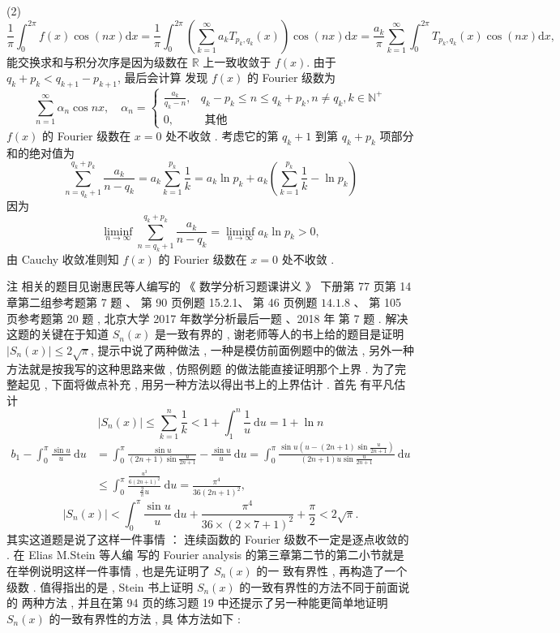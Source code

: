 \documentclass[10pt]{article}
\begin{document}
{(2)
$$
\frac{1}{\pi} \int_{0}^{2 \pi} f(x) \cos (n x) \mathrm{d} x=\frac{1}{\pi} \int_{0}^{2 \pi}\left(\sum_{k=1}^{\infty} a_{k} T_{p_{k}, q_{k}}(x)\right) \cos (n x) \mathrm{d} x=\frac{a_{k}}{\pi} \sum_{k=1}^{\infty} \int_{0}^{2 \pi} T_{p_{k}, q_{k}}(x) \cos (n x) \mathrm{d} x,
$$
 能交换求和与积分次序是因为级数在  $\mathbb{R}$  上一致收敛于  $f(x)$.  由于  $q_{k}+p_{k}<q_{k+1}-p_{k+1}$,  最后会计算   发现  $f(x)$  的  Fourier  级数为 
$$
\sum_{n=1}^{\infty} \alpha_{n} \cos n x, \quad \alpha_{n}= \begin{cases}\frac{a_{k}}{q_{k}-n}, & q_{k}-p_{k} \leqslant n \leqslant q_{k}+p_{k}, n \neq q_{k}, k \in \mathbb{N}^{+} \\ 0, & \text { 其他 }\end{cases}
$$
$f(x)$  的  Fourier  级数在  $x=0$  处不收敛 .  考虑它的第  $q_{k}+1$  到第  $q_{k}+p_{k}$  项部分和的绝对值为 
$$
\sum_{n=q_{k}+1}^{q_{k}+p_{k}} \frac{a_{k}}{n-q_{k}}=a_{k} \sum_{k=1}^{p_{k}} \frac{1}{k}=a_{k} \ln p_{k}+a_{k}\left(\sum_{k=1}^{p_{k}} \frac{1}{k}-\ln p_{k}\right)
$$
 因为 
$$
\liminf _{n \rightarrow \infty} \sum_{n=q_{k}+1}^{q_{k}+p_{k}} \frac{a_{k}}{n-q_{k}}=\liminf _{n \rightarrow \infty} a_{k} \ln p_{k}>0,
$$
 由  Cauchy  收敛准则知  $f(x)$  的  Fourier  级数在  $x=0$  处不收敛 .

 注   相关的题目见谢惠民等人编写的 《 数学分析习题课讲义 》 下册第  77  页第  14  章第二组参考题第  7  题 、 第  90  页例题  15.2.1、 第  46  页例题  $14.1 .8$ 、 第  105  页参考题第  20  题 ,  北京大学  2017  年数学分析最后一题 、2018  年   第  7  题 .  解决这题的关键在于知道  $S_{n}(x)$  是一致有界的 ,  谢老师等人的书上给的题目是证明  $\left|S_{n}(x)\right| \leqslant 2 \sqrt{\pi}$,  提示中说了两种做法 ,  一种是模仿前面例题中的做法 ,  另外一种方法就是按我写的这种思路来做 ,  仿照例题   的做法能直接证明那个上界 .  为了完整起见 ,  下面将做点补充 ,  用另一种方法以得出书上的上界估计 .  首先   有平凡估计 
$$
\left|S_{n}(x)\right| \leqslant \sum_{k=1}^{n} \frac{1}{k}<1+\int_{1}^{n} \frac{1}{u} \mathrm{~d} u=1+\ln n
$$
$$
\begin{aligned}
b_{1}-\int_{0}^{\pi} \frac{\sin u}{u} \mathrm{~d} u &=\int_{0}^{\pi} \frac{\sin u}{(2 n+1) \sin \frac{u}{2 n+1}}-\frac{\sin u}{u} \mathrm{~d} u=\int_{0}^{\pi} \frac{\sin u\left(u-(2 n+1) \sin \frac{u}{2 n+1}\right)}{(2 n+1) u \sin \frac{u}{2 n+1}} \mathrm{~d} u \\
& \leqslant \int_{0}^{\pi} \frac{\frac{u^{3}}{6(2 n+1)^{2}}}{\frac{2}{\pi} u} \mathrm{~d} u=\frac{\pi^{4}}{36(2 n+1)^{2}},
\end{aligned}
$$
$$
\left|S_{n}(x)\right|<\int_{0}^{\pi} \frac{\sin u}{u} \mathrm{~d} u+\frac{\pi^{4}}{36 \times(2 \times 7+1)^{2}}+\frac{\pi}{2}<2 \sqrt{\pi} .
$$
 其实这道题是说了这样一件事情 ： 连续函数的  Fourier  级数不一定是逐点收敛的 .  在  Elias M.Stein  等人编   写的  Fourier analysis  的第三章第二节的第二小节就是在举例说明这样一件事情 ,  也是先证明了  $S_{n}(x)$  的一   致有界性 ,  再构造了一个级数 .  值得指出的是 , Stein  书上证明  $S_{n}(x)$  的一致有界性的方法不同于前面说的   两种方法 ,  并且在第  94  页的练习题  19  中还提示了另一种能更简单地证明  $S_{n}(x)$  的一致有界性的方法 ,  具   体方法如下 :

}
\end{document}
